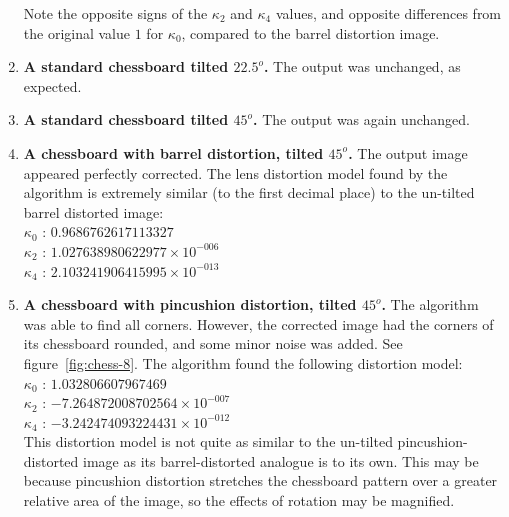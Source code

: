 \begin{enumerate}
   Note the opposite signs of the $\kappa_{2}$ and $\kappa_{4}$ values, and opposite differences from the original value $1$ for $\kappa_{0}$, compared to the barrel distortion image.
  \item \textbf{A standard chessboard tilted $22.5^o$.} The output was unchanged, as expected.
  \item \textbf{A standard chessboard tilted $45^o$.} The output was again unchanged.
  \item \textbf{A chessboard with barrel distortion, tilted $45^o$.} The output image appeared perfectly corrected. The lens distortion model found by the algorithm is extremely similar (to the first decimal place) to the un-tilted barrel distorted image:\\
   $ \kappa_{0}$ : $0.9686762617113327$\\
   $ \kappa_{2}$ : $1.027638980622977 \times 10^{-006}$\\
   $ \kappa_{4}$ : $2.103241906415995 \times 10^{-013}$
  \item \textbf{A chessboard with pincushion distortion, tilted $45^o$.} The algorithm was able to find all corners. However, the corrected image had the corners of its chessboard rounded, and some minor noise was added. See figure~\ref{fig:chess-8}. The algorithm found the following distortion model:\\
   $ \kappa_{0}$ : $1.032806607967469$\\
   $ \kappa_{2}$ : $-7.264872008702564 \times 10^{-007}$\\
   $ \kappa_{4}$ : $-3.242474093224431 \times 10^{-012}$\\
   This distortion model is not quite as similar to the un-tilted pincushion-distorted image as its barrel-distorted analogue is to its own. This may be because pincushion distortion stretches the chessboard pattern over a greater relative area of the image, so the effects of rotation may be magnified.
\begin{figure}[H]
  \centering

\end{figure}
\end{enumerate}
